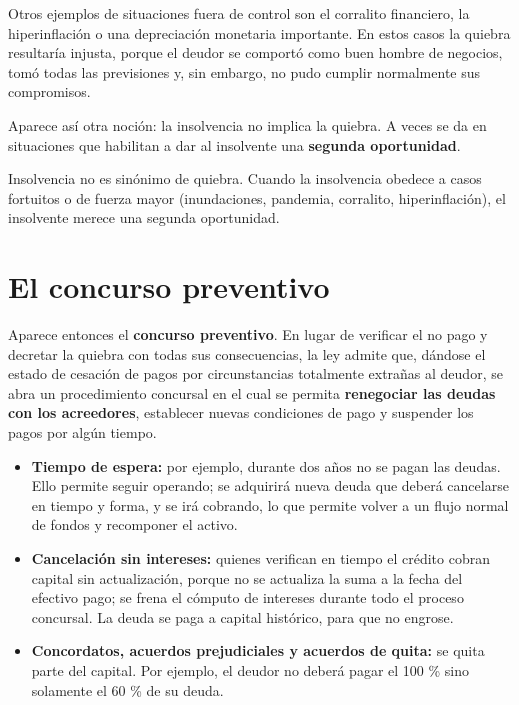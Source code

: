 \documentclass[12pt,oneside]{book}
\begin{document}
Otros ejemplos de situaciones fuera de control son el corralito financiero, la hiperinflación o una depreciación monetaria importante. En estos casos la quiebra resultaría injusta, porque el deudor se comportó como buen hombre de negocios, tomó todas las previsiones y, sin embargo, no pudo cumplir normalmente sus compromisos.

Aparece así otra noción: la insolvencia no implica la quiebra. A veces se da en situaciones que habilitan a dar al insolvente una \textbf{segunda oportunidad}.

\begin{important}
Insolvencia no es sinónimo de quiebra. Cuando la insolvencia obedece a casos fortuitos o de fuerza mayor (inundaciones, pandemia, corralito, hiperinflación), el insolvente merece una segunda oportunidad.
\end{important}

\section{El concurso preventivo}

Aparece entonces el \textbf{concurso preventivo}. En lugar de verificar el no pago y decretar la quiebra con todas sus consecuencias, la ley admite que, dándose el estado de cesación de pagos por circunstancias totalmente extrañas al deudor, se abra un procedimiento concursal en el cual se permita \textbf{renegociar las deudas con los acreedores}, establecer nuevas condiciones de pago y suspender los pagos por algún tiempo.

\begin{itemize}
    \item \textbf{Tiempo de espera:} por ejemplo, durante dos años no se pagan las deudas. Ello permite seguir operando; se adquirirá nueva deuda que deberá cancelarse en tiempo y forma, y se irá cobrando, lo que permite volver a un flujo normal de fondos y recomponer el activo.
    \item \textbf{Cancelación sin intereses:} quienes verifican en tiempo el crédito cobran capital sin actualización, porque no se actualiza la suma a la fecha del efectivo pago; se frena el cómputo de intereses durante todo el proceso concursal. La deuda se paga a capital histórico, para que no engrose.
    \item \textbf{Concordatos, acuerdos prejudiciales y acuerdos de quita:} se quita parte del capital. Por ejemplo, el deudor no deberá pagar el 100 \% sino solamente el 60 \% de su deuda.
\end{itemize}
\end{document}
